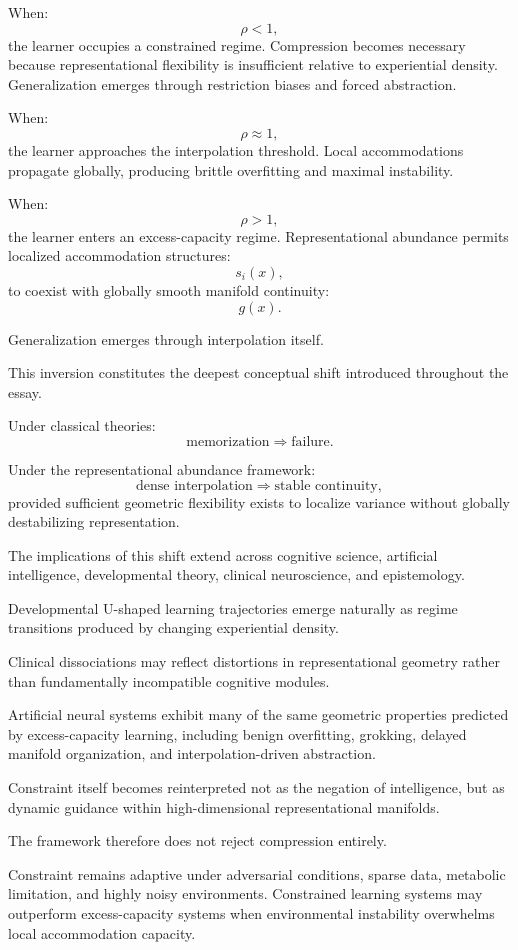 \documentclass[12pt,a4paper]{article}
\begin{document}
When:
\[
\rho
<
1,
\]
the learner occupies a constrained regime. Compression becomes necessary because representational flexibility is insufficient relative to experiential density. Generalization emerges through restriction biases and forced abstraction.

When:
\[
\rho
\approx
1,
\]
the learner approaches the interpolation threshold. Local accommodations propagate globally, producing brittle overfitting and maximal instability.

When:
\[
\rho
>
1,
\]
the learner enters an excess-capacity regime. Representational abundance permits localized accommodation structures:
\[
s_i(x),
\]
to coexist with globally smooth manifold continuity:
\[
g(x).
\]

Generalization emerges through interpolation itself.

This inversion constitutes the deepest conceptual shift introduced throughout the essay.

Under classical theories:
\[
\text{memorization}
\Rightarrow
\text{failure}.
\]

Under the representational abundance framework:
\[
\text{dense interpolation}
\Rightarrow
\text{stable continuity},
\]
provided sufficient geometric flexibility exists to localize variance without globally destabilizing representation.

The implications of this shift extend across cognitive science, artificial intelligence, developmental theory, clinical neuroscience, and epistemology.

Developmental U-shaped learning trajectories emerge naturally as regime transitions produced by changing experiential density.

Clinical dissociations may reflect distortions in representational geometry rather than fundamentally incompatible cognitive modules.

Artificial neural systems exhibit many of the same geometric properties predicted by excess-capacity learning, including benign overfitting, grokking, delayed manifold organization, and interpolation-driven abstraction.

Constraint itself becomes reinterpreted not as the negation of intelligence, but as dynamic guidance within high-dimensional representational manifolds.

The framework therefore does not reject compression entirely.

Constraint remains adaptive under adversarial conditions, sparse data, metabolic limitation, and highly noisy environments. Constrained learning systems may outperform excess-capacity systems when environmental instability overwhelms local accommodation capacity.
\end{document}
